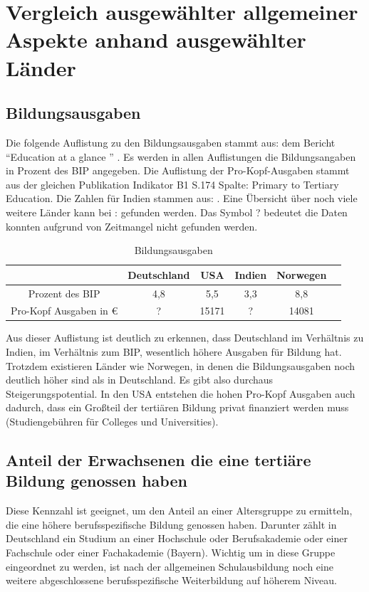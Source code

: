 \section{Vergleich ausgewählter allgemeiner Aspekte anhand ausgewählter Länder}

\subsection*{Bildungsausgaben}
Die folgende Auflistung zu den Bildungsausgaben stammt aus: dem Bericht ``Education at a glance '' \cite[Indikator B4. S.219]{oecd5}. 
Es werden in allen Auflistungen die Bildungsangaben in Prozent des BIP angegeben.
Die Auflistung der Pro-Kopf-Ausgaben stammt aus der gleichen Publikation Indikator B1 S.174 Spalte: Primary to Tertiary Education.
Die Zahlen für Indien stammen aus: \cite[2]{oester}. Eine Übersicht über noch viele weitere Länder kann bei : \cite[165]{hdr} gefunden werden. Das Symbol ? bedeutet die Daten konnten aufgrund von Zeitmangel nicht gefunden werden.

\begin{table}[htp]
\begin{tabular}{|c|c|c|c|c|c|}
\hline  	& Deutschland & USA & Indien  & Norwegen \\ 
\hline 	Prozent des BIP &4,8 & 5,5  & 3,3  & 8,8 \\ 
\hline  Pro-Kopf Ausgaben in € & ? & 15171 & ? & 14081 \\ 
\hline 
\end{tabular} 
\caption{Bildungsausgaben}
\end{table}
Aus dieser Auflistung ist deutlich zu erkennen, dass Deutschland im Verhältnis zu Indien, im Verhältnis zum BIP, wesentlich höhere Ausgaben für Bildung hat. Trotzdem existieren Länder wie Norwegen, in denen die Bildungsausgaben noch deutlich höher sind als in Deutschland. Es gibt also durchaus Steigerungspotential. In den USA entstehen die hohen Pro-Kopf Ausgaben auch dadurch, dass ein Großteil der tertiären Bildung privat finanziert werden muss (Studiengebühren für Colleges und Universities). 

\subsection*{Anteil der Erwachsenen die eine tertiäre Bildung genossen haben}
Diese Kennzahl ist geeignet, um den Anteil an einer Altersgruppe zu ermitteln, die eine höhere berufsspezifische Bildung genossen haben. Darunter zählt in Deutschland ein Studium an einer Hochschule oder Berufsakademie oder einer Fachschule oder einer Fachakademie (Bayern). Wichtig um in diese Gruppe eingeordnet zu werden, ist nach der allgemeinen Schulausbildung noch eine weitere abgeschlossene berufsspezifische Weiterbildung auf höherem Niveau.

